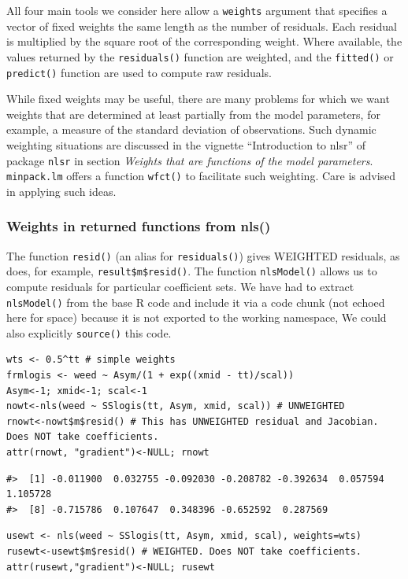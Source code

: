 All four main tools we consider here allow a \texttt{weights} argument that
specifies a vector of fixed weights the same length as the number of residuals.
Each residual is multiplied by the square root of the corresponding weight.
Where available, the values returned by the
\texttt{residuals()} function are weighted, and the \texttt{fitted()} or \texttt{predict()} function are
used to compute raw residuals.

While fixed weights may be useful, there are many problems for which
we want weights that are determined at least partially from the model
parameters, for
example, a measure of the standard deviation of observations.
Such dynamic weighting situations are discussed in the vignette
``Introduction to nlsr'' of package \texttt{nlsr} in section
\emph{Weights that are functions of the model parameters}.
\texttt{minpack.lm} offers a function \texttt{wfct()} to
facilitate such weighting. Care is advised
in applying such ideas.

\subsubsection{Weights in returned functions from nls()}\label{weights-in-returned-functions-from-nls}

The function \texttt{resid()} (an alias for \texttt{residuals()}) gives WEIGHTED residuals,
as does, for example, \texttt{result\$m\$resid()}. The function \texttt{nlsModel()}
allows us to compute residuals for particular coefficient sets.
We have had to extract \texttt{nlsModel()} from the base R code and include it via a code chunk
(not echoed here for space) because it is not exported to the working namespace,
We could also explicitly \texttt{source()} this code.

\begin{verbatim}
wts <- 0.5^tt # simple weights
frmlogis <- weed ~ Asym/(1 + exp((xmid - tt)/scal))
Asym<-1; xmid<-1; scal<-1
nowt<-nls(weed ~ SSlogis(tt, Asym, xmid, scal)) # UNWEIGHTED
rnowt<-nowt$m$resid() # This has UNWEIGHTED residual and Jacobian. Does NOT take coefficients.
attr(rnowt, "gradient")<-NULL; rnowt
\end{verbatim}

\begin{verbatim}
#>  [1] -0.011900  0.032755 -0.092030 -0.208782 -0.392634  0.057594  1.105728
#>  [8] -0.715786  0.107647  0.348396 -0.652592  0.287569
\end{verbatim}

\begin{verbatim}
usewt <- nls(weed ~ SSlogis(tt, Asym, xmid, scal), weights=wts)
rusewt<-usewt$m$resid() # WEIGHTED. Does NOT take coefficients.
attr(rusewt,"gradient")<-NULL; rusewt
\end{verbatim}

